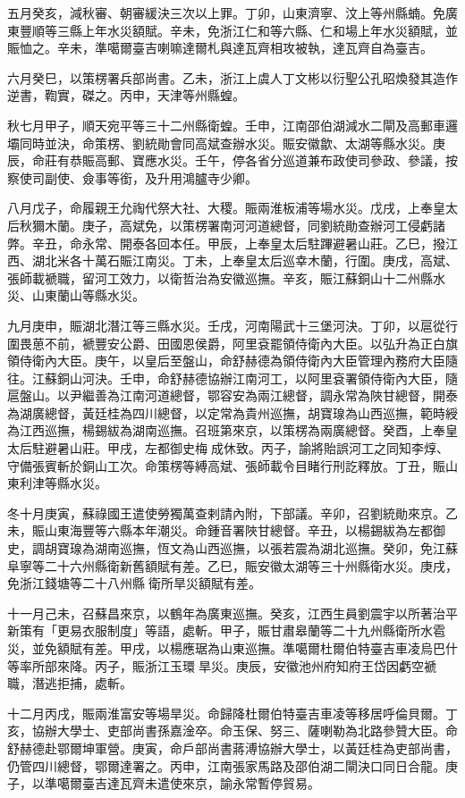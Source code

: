 \begin{pinyinscope}
五月癸亥，減秋審、朝審緩決三次以上罪。丁卯，山東濟寧、汶上等州縣蝻。免廣東豐順等三縣上年水災額賦。辛未，免浙江仁和等六縣、仁和場上年水災額賦，並賑恤之。辛未，準噶爾臺吉喇嘛達爾札與達瓦齊相攻被執，達瓦齊自為臺吉。

六月癸巳，以策楞署兵部尚書。乙未，浙江上虞人丁文彬以衍聖公孔昭煥發其造作逆書，鞫實，磔之。丙申，天津等州縣蝗。

秋七月甲子，順天宛平等三十二州縣衛蝗。壬申，江南邵伯湖減水二閘及高郵車邏壩同時並決，命策楞、劉統勛會同高斌查辦水災。賑安徽歙、太湖等縣水災。庚辰，命莊有恭賑高郵、寶應水災。壬午，停各省分巡道兼布政使司參政、參議，按察使司副使、僉事等銜，及升用鴻臚寺少卿。

八月戊子，命履親王允祹代祭大社、大稷。賑兩淮板浦等場水災。戊戌，上奉皇太后秋獮木蘭。庚子，高斌免，以策楞署南河河道總督，同劉統勛查辦河工侵虧諸弊。辛丑，命永常、開泰各回本任。甲辰，上奉皇太后駐蹕避暑山莊。乙巳，撥江西、湖北米各十萬石賑江南災。丁未，上奉皇太后巡幸木蘭，行圍。庚戌，高斌、張師載褫職，留河工效力，以衛哲治為安徽巡撫。辛亥，賑江蘇銅山十二州縣水災、山東蘭山等縣水災。

九月庚申，賑湖北潛江等三縣水災。壬戌，河南陽武十三堡河決。丁卯，以扈從行圍畏葸不前，褫豐安公爵、田國恩侯爵，阿里袞罷領侍衛內大臣。以弘升為正白旗領侍衛內大臣。庚午，以皇后至盤山，命舒赫德為領侍衛內大臣管理內務府大臣隨往。江蘇銅山河決。壬申，命舒赫德協辦江南河工，以阿里袞署領侍衛內大臣，隨扈盤山。以尹繼善為江南河道總督，鄂容安為兩江總督，調永常為陜甘總督，開泰為湖廣總督，黃廷桂為四川總督，以定常為貴州巡撫，胡寶瑔為山西巡撫，範時綬為江西巡撫，楊錫紱為湖南巡撫。召班第來京，以策楞為兩廣總督。癸酉，上奉皇太后駐避暑山莊。甲戌，左都御史梅成休致。丙子，諭將貽誤河工之同知李焞、守備張賓斬於銅山工次。命策楞等縛高斌、張師載令目睹行刑訖釋放。丁丑，賑山東利津等縣水災。

冬十月庚寅，蘇祿國王遣使勞獨萬查剌請內附，下部議。辛卯，召劉統勛來京。乙未，賑山東海豐等六縣本年潮災。命鍾音署陜甘總督。辛丑，以楊錫紱為左都御史，調胡寶瑔為湖南巡撫，恆文為山西巡撫，以張若震為湖北巡撫。癸卯，免江蘇阜寧等二十六州縣衛新舊額賦有差。乙巳，賑安徽太湖等三十州縣衛水災。庚戌，免浙江錢塘等二十八州縣衛所旱災額賦有差。

十一月己未，召蘇昌來京，以鶴年為廣東巡撫。癸亥，江西生員劉震宇以所著治平新策有「更易衣服制度」等語，處斬。甲子，賑甘肅皋蘭等二十九州縣衛所水雹災，並免額賦有差。甲戌，以楊應琚為山東巡撫。準噶爾杜爾伯特臺吉車凌烏巴什等率所部來降。丙子，賑浙江玉環旱災。庚辰，安徽池州府知府王岱因虧空褫職，潛逃拒捕，處斬。

十二月丙戌，賑兩淮富安等場旱災。命歸降杜爾伯特臺吉車凌等移居呼倫貝爾。丁亥，協辦大學士、吏部尚書孫嘉淦卒。命玉保、努三、薩喇勒為北路參贊大臣。命舒赫德赴鄂爾坤軍營。庚寅，命戶部尚書蔣溥協辦大學士，以黃廷桂為吏部尚書，仍管四川總督，鄂爾達署之。丙申，江南張家馬路及邵伯湖二閘決口同日合龍。庚子，以準噶爾臺吉達瓦齊未遣使來京，諭永常暫停貿易。


\end{pinyinscope}
